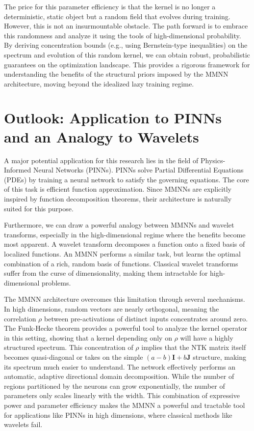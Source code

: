 \documentclass[12pt]{article}
\begin{document}
The price for this parameter efficiency is that the kernel is no longer a deterministic, static object but a random field that evolves during training. However, this is not an insurmountable obstacle. The path forward is to embrace this randomness and analyze it using the tools of high-dimensional probability. By deriving concentration bounds (e.g., using Bernstein-type inequalities) on the spectrum and evolution of this random kernel, we can obtain robust, probabilistic guarantees on the optimization landscape. This provides a rigorous framework for understanding the benefits of the structural priors imposed by the MMNN architecture, moving beyond the idealized lazy training regime.

\section{Outlook: Application to PINNs and an Analogy to Wavelets}
A major potential application for this research lies in the field of Physics-Informed Neural Networks (PINNs). PINNs solve Partial Differential Equations (PDEs) by training a neural network to satisfy the governing equations. The core of this task is efficient function approximation. Since MMNNs are explicitly inspired by function decomposition theorems, their architecture is naturally suited for this purpose.

Furthermore, we can draw a powerful analogy between MMNNs and wavelet transforms, especially in the high-dimensional regime where the benefits become most apparent. A wavelet transform decomposes a function onto a fixed basis of localized functions. An MMNN performs a similar task, but learns the optimal combination of a rich, random basis of functions. Classical wavelet transforms suffer from the curse of dimensionality, making them intractable for high-dimensional problems.

The MMNN architecture overcomes this limitation through several mechanisms. In high dimensions, random vectors are nearly orthogonal, meaning the correlation $\rho$ between pre-activations of distinct inputs concentrates around zero. The Funk-Hecke theorem provides a powerful tool to analyze the kernel operator in this setting, showing that a kernel depending only on $\rho$ will have a highly structured spectrum. This concentration of $\rho$ implies that the NTK matrix itself becomes quasi-diagonal or takes on the simple $(a-b)\mathbf{I} + b\mathbf{J}$ structure, making its spectrum much easier to understand. The network effectively performs an automatic, adaptive directional domain decomposition. While the number of regions partitioned by the neurons can grow exponentially, the number of parameters only scales linearly with the width. This combination of expressive power and parameter efficiency makes the MMNN a powerful and tractable tool for applications like PINNs in high dimensions, where classical methods like wavelets fail.
\end{document}
